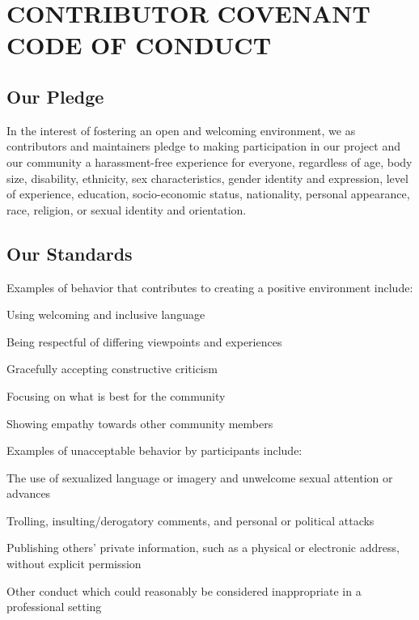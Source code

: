 
\chapter*{CONTRIBUTOR COVENANT \\ CODE OF CONDUCT}


 \section*{Our Pledge}

  In the interest of fostering an open and welcoming environment, we as
  contributors and maintainers pledge to making participation in our project and
  our community a harassment-free experience for everyone, regardless of age, body
  size, disability, ethnicity, sex characteristics, gender identity and expression,
  level of experience, education, socio-economic status, nationality, personal
  appearance, race, religion, or sexual identity and orientation.

 \section*{Our Standards}

  Examples of behavior that contributes to creating a positive environment
  include:

\begin{compactitem}
  \item Using welcoming and inclusive language
  \item Being respectful of differing viewpoints and experiences
  \item Gracefully accepting constructive criticism
  \item Focusing on what is best for the community
  \item Showing empathy towards other community members
\end{compactitem}

  Examples of unacceptable behavior by participants include:

  \begin{compactitem}
    \item The use of sexualized language or imagery and unwelcome sexual attention or advances
    \item Trolling, insulting/derogatory comments, and personal or political attacks
    \item Publishing others' private information, such as a physical or electronic address, without explicit permission
    \item Other conduct which could reasonably be considered inappropriate in a professional setting
  \end{compactitem}

